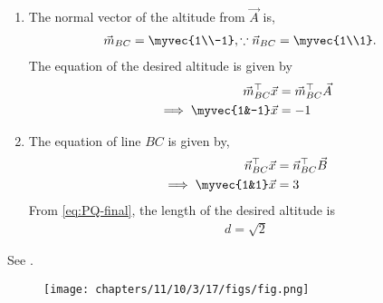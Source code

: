\begin{enumerate}
\item The normal vector of the altitude from $\vec{A}$ is,
\begin{align}
\vec{m}_{BC}
= \myvec{1\\-1},
\because \vec{n}_{BC} &= \myvec{1\\1}.
\end{align}
The equation of the desired altitude  is given by
\begin{align}
\vec{m}_{BC}^{\top}\vec{x} &=\vec{m}_{BC}^{\top}\vec{A}\\
\implies \myvec{1&-1}\vec{x} &= -1
\end{align}
	\item
The equation of line $BC$ is given by,
\begin{align}
{\vec{n}^{\top}_{BC}}\vec{x} &= {\vec{n}^{\top}_{BC}}\vec{B}\\
\implies \myvec{1&1}\vec{x}  &= 3
\end{align}
			From \eqref{eq:PQ-final},
the length of the desired altitude is 
\begin{align}
d =  \sqrt{2}
\end{align}

\end{enumerate}
See 
.
\begin{figure}[H]
\centering
\texttt{[image: chapters/11/10/3/17/figs/fig.png]}
\caption{}
\label{fig:chapters/11/10/3/17/1}
\end{figure}
